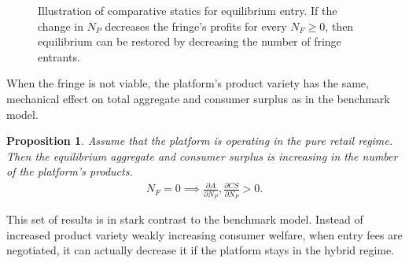 \documentclass[a4paper]{article}
\newtheorem{proposition}{Proposition}
\begin{document}
\begin{figure}[ht]
    \centering
    \caption{Illustration of comparative statics for equilibrium entry. If the change in $N_P$ decreases the fringe's profits for every $N_F \geq 0$, then equilibrium can be restored by decreasing the number of fringe entrants.}
    \label{fig:comparative_N_F}
\end{figure}

When the fringe is not viable, the platform's product variety has the same, mechanical effect on total aggregate and consumer surplus as in the benchmark model.
\begin{proposition}
    \label{prop:aggregate_comparative_retail}
    Assume that the platform is operating in the pure retail regime. Then the equilibrium aggregate and consumer surplus is increasing in the number of the platform's products.
    \begin{align*}
        N_F = 0 \implies \frac{\partial A}{\partial N_P}, \frac{\partial CS}{\partial N_P} > 0.
    \end{align*}
\end{proposition}
This set of results is in stark contrast to the benchmark model.
Instead of increased product variety weakly increasing consumer welfare, when entry fees are negotiated, it can actually decrease it if the platform stays in the hybrid regime.
\end{document}
